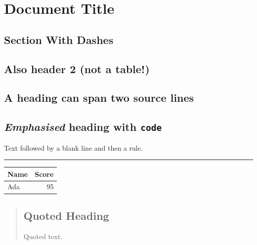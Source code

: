 \section{Document Title}

\subsection{Section With Dashes}

\subsection{Also header 2 (not a table!)}

\subsection{A heading can span two source lines}

\subsection{\textit{Emphasised} heading with \texttt{code}}

Text followed by a blank line and then a rule.


\noindent\rule{\linewidth}{0.4pt}

\begin{tabular}{lr}
\toprule
Name & Score \\
\midrule
Ada & 95 \\
\bottomrule
\end{tabular}

\begin{quote}
\subsection{Quoted Heading}

Quoted text.

\end{quote}


